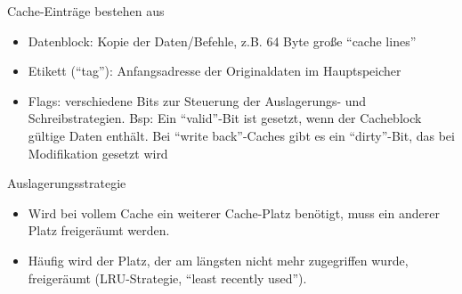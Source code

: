 \documentclass[utf8,9pt]{beamer}
\begin{document}
\begin{frame}{}{}
\begin{block}{Cache-Einträge}
bestehen aus
\begin{itemize}
\item Datenblock: Kopie der Daten/Befehle, z.B. 64 Byte große "`cache lines"'
\item Etikett ("`tag"'): Anfangsadresse der Originaldaten im Hauptspeicher
\item Flags: verschiedene Bits zur Steuerung der Auslagerungs- und Schreibstrategien.
Bsp: Ein "`valid"'-Bit ist gesetzt, wenn der Cacheblock gültige Daten
enthält.  Bei "`write back"'-Caches gibt es ein "`dirty"'-Bit, das bei Modifikation gesetzt wird
\end{itemize}

\end{block}


\begin{block}{Auslagerungsstrategie}
\begin{itemize}
\item Wird bei vollem Cache ein weiterer Cache-Platz benötigt, muss ein anderer
Platz freigeräumt werden. 
\item Häufig wird der Platz, der am längsten nicht
mehr zugegriffen wurde, freigeräumt (LRU-Strategie, "`least recently used"').
\end{itemize}
\end{block}
\end{frame}
\end{document}
